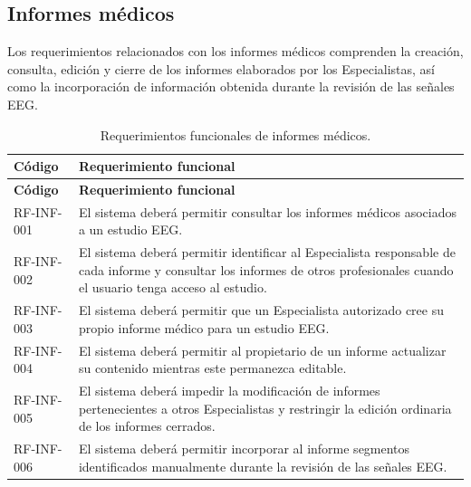 \subsection{Informes médicos}
\label{subsec:rf-informes}

Los requerimientos relacionados con los informes médicos comprenden la
creación, consulta, edición y cierre de los informes elaborados por los
Especialistas, así como la incorporación de información obtenida durante la
revisión de las señales EEG.

\begin{longtable}{|p{}|p{}|}
    \caption{Requerimientos funcionales de informes médicos.}
    \label{tab:rf-inf}\\
    \hline
    \textbf{Código} & \textbf{Requerimiento funcional} \\
    \hline
    \endfirsthead

    \hline
    \textbf{Código} & \textbf{Requerimiento funcional} \\
    \hline
    \endhead

    RF-INF-001 &
    El sistema deberá permitir consultar los informes médicos asociados a un
    estudio EEG. \\
    \hline

    RF-INF-002 &
    El sistema deberá permitir identificar al Especialista responsable de cada
    informe y consultar los informes de otros profesionales cuando el usuario
    tenga acceso al estudio. \\
    \hline

    RF-INF-003 &
    El sistema deberá permitir que un Especialista autorizado cree su propio
    informe médico para un estudio EEG. \\
    \hline

    RF-INF-004 &
    El sistema deberá permitir al propietario de un informe actualizar su
    contenido mientras este permanezca editable. \\
    \hline

    RF-INF-005 &
    El sistema deberá impedir la modificación de informes pertenecientes a
    otros Especialistas y restringir la edición ordinaria de los informes
    cerrados. \\
    \hline

    RF-INF-006 &
    El sistema deberá permitir incorporar al informe segmentos identificados
    manualmente durante la revisión de las señales EEG. \\
    \hline


\end{longtable}
